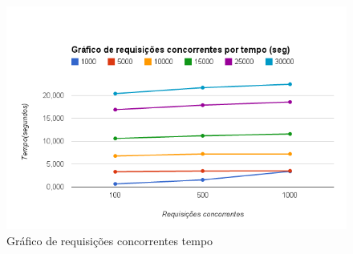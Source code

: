     \begin{figure}[htb]
    \centering
    \includegraphics[scale=0.7]{images/req_conc_tempo.png}
    \caption{Gráfico de requisições concorrentes tempo}
    \label{fig: Gráfico de requisições concorrentes por tempo}
    \end{figure}












